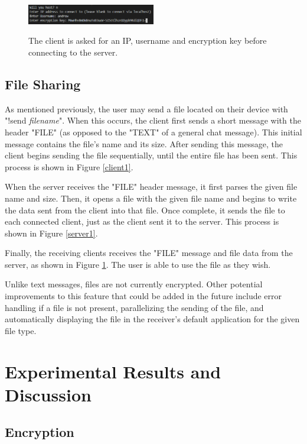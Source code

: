 \documentclass{article}
\begin{document}
\begin{figure}[h]
\caption{The client is asked for an IP, username and encryption key before connecting to the server.}
\centering
\includegraphics[width=0.5\textwidth]{media/StartCode.PNG}
\label{client3}
\end{figure}

\subsection{File Sharing}

As mentioned previously, the user may send a file located on their device with "!send \emph{filename}". When this occurs, the client first sends a short message with the header "FILE" (as opposed to the "TEXT" of a general chat message). This initial message contains the file's name and its size. After sending this message, the client begins sending the file sequentially, until the entire file has been sent. This process is shown in Figure \ref{client1}.

When the server receives the "FILE" header message, it first parses the given file name and size. Then, it opens a file with the given file name and begins to write the data sent from the client into that file. Once complete, it sends the file to each connected client, just as the client sent it to the server. This process is shown in Figure \ref{server1}.

Finally, the receiving clients receives the "FILE" message and file data from the server, as shown in Figure \ref{client3}. The user is able to use the file as they wish.

Unlike text messages, files are not currently encrypted. Other potential improvements to this feature that could be added in the future include error handling if a file is not present, parallelizing the sending of the file, and automatically displaying the file in the receiver's default application for the given file type.

\section{Experimental Results and Discussion}

\subsection{Encryption}
\end{document}
